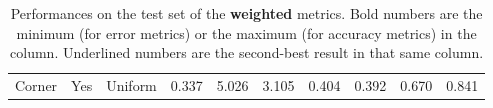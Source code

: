 \begin{table}
\begin{tabular}{c|c|c|c|c|c|c|c|c|c}
        Corner & Yes & Uniform &             0.337  &            5.026  &            3.105  &            0.404  &            0.392  &            0.670  &            0.841  \\
    \end{tabular}
    \caption{
        Performances on the test set of the \textbf{weighted} metrics.
        Bold numbers are the minimum (for error metrics) or the maximum (for accuracy metrics) in the column.
        Underlined numbers are the second-best result in that same column.
        \label{t:weighted_results}
    }
\end{table}